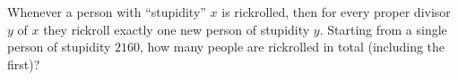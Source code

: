 Whenever a person with ``stupidity'' $x$ is rickrolled, then for every proper divisor $y$ of $x$ they rickroll exactly one new person of stupidity $y$. Starting from a single person of stupidity $2160$, how many people are rickrolled in total (including the first)?
